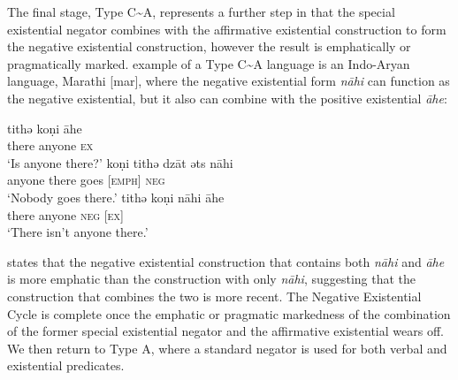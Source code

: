 ﻿\documentclass[output=paper]{langsci/langscibook}
\begin{document}
%
The final stage, Type C{\textasciitilde}A, represents a further step in
that the special existential negator combines with the affirmative
existential construction to form the negative existential construction,
however the result is emphatically or pragmatically marked.
 example of a Type C{\textasciitilde}A language is an
Indo-Aryan language, Marathi [mar], where the negative existential form
\textit{nāhi} can function as the negative existential, but it also can
combine with the positive existential \textit{āhe}:
%
\begin{exe}\ex\label{ex:ieur-marathi-anyone}
\begin{xlist}
\ex
    \gll tithǝ  koṇi      āhe \\
there anyone \textsc{ex} \\
    \glt `Is anyone there?'
\ex
\gll koṇi      tithǝ  dzāt {\ob}ǝts{\cb}     nāhi\\
anyone there goes [\textsc{emph}] \textsc{neg}\\
\glt `Nobody goes there.'
\ex
\gll tithǝ  koṇi      nāhi {\ob}āhe{\cb}\\
there anyone \textsc{neg}  [\textsc{ex}]\\
\glt `There isn't anyone there.'
\end{xlist}\end{exe}
%
\citet[12]{Croft1991} states that the negative existential construction
that contains both \textit{nāhi} and \textit{āhe} is more emphatic than the
construction with only \textit{nāhi}, suggesting that the construction that
combines the two is more recent. The Negative Existential Cycle is complete
once the emphatic or pragmatic markedness of the combination of the former
special existential negator and the affirmative existential wears off. We
then return to Type A, where a standard negator is used for both verbal and
existential predicates. 
\end{document}
